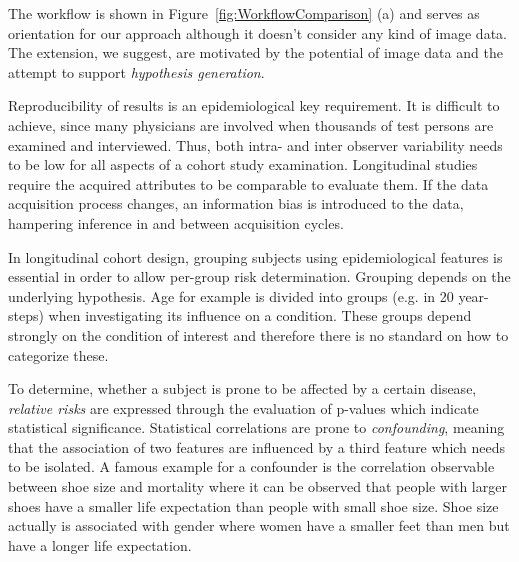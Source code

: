 \documentclass[journal]{style/vgtc} 			          %
\begin{document}
The workflow is shown in Figure~\ref{fig:WorkflowComparison} (a) and serves as orientation for our approach although it doesn't consider any kind of image data.
%
The extension, we suggest, are motivated by the potential of image data and the attempt to support \emph{hypothesis generation}.

Reproducibility of results is an epidemiological key requirement.
%
It is difficult to achieve, since many physicians are involved when thousands of test persons are examined and interviewed.
%
Thus, both intra- and inter observer variability needs to be low for all aspects of a cohort study examination.
%
Longitudinal studies require the acquired attributes to be comparable to evaluate them.
%
If the data acquisition process changes, an information bias is introduced to the data, hampering inference in and between acquisition cycles.
%

In longitudinal cohort design, grouping subjects using epidemiological features is essential in order to allow per-group risk determination.
%
Grouping depends on the underlying hypothesis.
%
Age for example is divided into groups (e.g. in 20 year-steps) when investigating its influence on a condition.
%
These groups depend strongly on the condition of interest and therefore there is no standard on how to categorize these.

To determine, whether a subject is prone to be affected by a certain disease, \emph{relative risks} are expressed through the evaluation of p-values which indicate statistical significance.
%
Statistical correlations are prone to \emph{confounding}, meaning that the association of two features are influenced by a third feature which needs to be isolated.
%
A famous example for a confounder is the correlation observable between shoe size and mortality where it can be observed that people with larger shoes have a smaller life expectation than people with small shoe size.
%
Shoe size actually is associated with gender where women have a smaller feet than men but have a longer life expectation.
%
\end{document}
